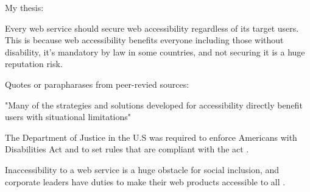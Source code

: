\documentclass[10pt,a4paper]{article}
\begin{document}
My thesis:

Every web service should secure web accessibility regardless of its target users. This is because web accessibility benefits everyone including those without disability, it's mandatory by law in some countries, and not securing it is a huge reputation risk. 


Quotes or parapharases from peer-revied sources:

"Many  of  the  strategies  and  solutions developed for accessibility directly benefit users with situational limitations" \citep{UniversalWeb}

The Department of Justice in the U.S was required to enforce Americans with Disabilities Act and to set rules that are compliant with the act \citep{DOJ}.

Inaccessibility to a web service is a huge obstacle for social inclusion, and corporate leaders have duties to make their web products accessible to all \citep{EnterpriseWeb}.



\end{document}

